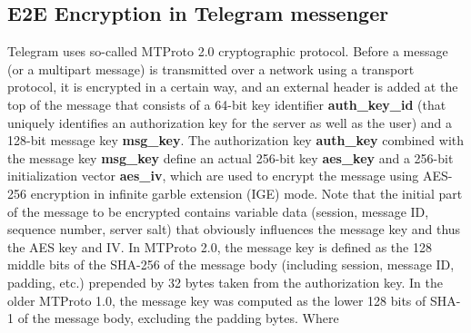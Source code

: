 \subsection{E2E Encryption in Telegram messenger}\label{subsec:e2e-encryption-in-telegram-messenger}
Telegram uses so-called MTProto 2.0 cryptographic protocol.
Before a message (or a multipart message) is transmitted over a network using a transport protocol, it is encrypted
in a certain way, and an external header is added at the top of the message that consists of a 64-bit key identifier
\textbf{auth\_key\_id} (that uniquely identifies an authorization key for the server as well as the user) and
a 128-bit message key \textbf{msg\_key}.
The authorization key \textbf{auth\_key} combined with the message key \textbf{msg\_key} define an actual 256-bit
key \textbf{aes\_key} and
a 256-bit initialization vector \textbf{aes\_iv}, which are used to encrypt the message using AES-256 encryption in
infinite garble extension (IGE) mode.
Note that the initial part of the message to be encrypted contains variable data
(session, message ID, sequence number, server salt) that obviously influences the message key and thus the AES key
and IV\@.
In MTProto 2.0, the message key is defined as the 128 middle bits of the SHA-256 of the message body
(including session, message ID, padding, etc.) prepended by 32 bytes taken from the authorization key.
In the older MTProto 1.0, the message key was computed as the lower 128 bits of SHA-1 of the message body,
excluding the padding bytes.
Where
